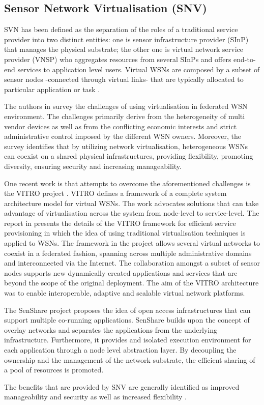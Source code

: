 \subsection{Sensor Network Virtualisation (SNV)}
SVN has been defined \cite{islam2012survey,Chowdhury2009Network} as the separation of the roles of a traditional service provider into two distinct entities: one is sensor infrastructure provider (SInP) that manages the physical substrate; the other one is virtual network service provider (VNSP) who aggregates resources from several SInPs and offers end-to-end services to application level users. Virtual WSNs are composed by a subset of sensor nodes -connected through virtual links- that are typically allocated to particular application or task \cite{Lim:2009:VFH:1644038.1644080}.

The authors in \cite{islam2012virtualization} survey the challenges of using virtualisation in federated WSN environment. The challenges primarily derive from the heterogeneity of multi vendor devices as well as from the conflicting economic interests and strict administrative control imposed by the different WSN owners. Moreover, the survey identifies that by utilizing network virtualisation, heterogeneous WSNs can coexist on a shared physical infrastructures, providing flexibility, promoting diversity, ensuring security and increasing manageability.

One recent work is that attempts to overcome the aforementioned challenges is the VITRO project \cite{6076694}. VITRO defines a framework of a complete system architecture model for virtual WSNs. The work advocates solutions that can take advantage of virtualisation across the system from node-level to service-level. The report in \cite{sarakis2012framework} presents the details of the VITRO framework for efficient service provisioning in which the idea of using traditional virtualisation techniques is applied to WSNs. The framework in the project allows several virtual networks to coexist in a federated fashion, spanning across multiple administrative domains and interconnected via the Internet. The collaboration amongst a subset of sensor nodes supports new dynamically created applications and services that are beyond the scope of the original deployment. The aim of the VITRO architecture was to enable interoperable, adaptive and scalable virtual network platforms. 

The SenShare \cite{FRESnel_multi_application_WSN} project proposes the idea of open access infrastructures that can support multiple co-running applications. SenShare builds upon the concept of overlay networks and separates the applications from the underlying infrastructure. Furthermore, it provides and isolated execution environment for each application through a node level abstraction layer. By decoupling the ownership and the management of the network substrate, the efficient sharing of a pool of resources is promoted.
 
The benefits that are provided by SNV are generally identified as improved manageability and security as well as increased flexibility \cite{Chowdhury2009Network
	}.